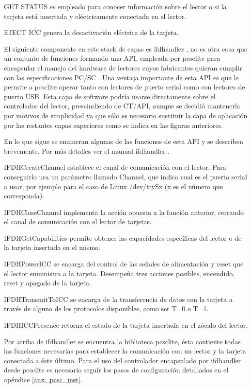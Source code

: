 GET STATUS es empleado para conocer información sobre el lector o si la tarjeta está insertada y eléctricamente conectada en el lector. 

EJECT ICC genera la desactivación eléctrica de la tarjeta.

\bigskip
{}
El siguiente componente en este stack de capas es ifdhandler \cite{ifdhandler}, no es otra cosa que un conjunto de funciones formando una API, empleada por pcsclite para encapsular el manejo del hardware de  lectores cuyos fabricantes quieran cumplir con las especificaciones PC/SC \cite{pcsclite_esp}. Una ventaja importante de esta API es que le permite a pcsclite operar tanto con lectores de puerto serial como con lectores de puerto USB.
Esta capa de software podría usarse directamente sobre el controlador del lector, prescindiendo de CT/API, aunque se decidió mantenerla por motivos de simplicidad ya que sólo es necesario sustituir la capa de aplicación por las restantes capas superiores como se indica en las figuras anteriores.

\bigskip
En lo que sigue se enumeran algunas de las funciones de esta API y se describen brevemente. Por más detalles ver el manual ifdhandler \cite{ifdhandler}.

\bigskip
IFDHCreateChannel establece el canal de comunicación con el lector. Para conseguirlo usa un parámetro llamado Channel, que indica cual es el puerto serial a usar, por ejemplo para el caso de Linux /dev/ttySx (x es el número que corresponda).

IFDHCloseChannel implementa la acción opuesta a la función anterior, cerrando el canal de comunicación con el lector de tarjetas.

IFDHGetCapabilities permite obtener las capacidades específicas del lector o de la tarjeta insertada en el mismo.

IFDHPowerICC se encarga del control de las señales de alimentación y reset que el lector suministra a la tarjeta. Desempeña tres acciones posibles, encendido, reset y apagado de la tarjeta.

IFDHTransmitToICC se encarga de la transferencia de datos con la tarjeta a través de alguno de los protocolos disponibles, como ser T=0 o T=1.

IFDHICCPresence retorna el estado de la tarjeta insertada en el zócalo del lector.

\bigskip
{}
Por arriba de ifdhandler se encuentra la biblioteca pcsclite, ésta contiente todas las funciones necesarias para establecer la comunicación con un lector y la tarjeta conectada a éste último. Para el uso del controlador encapsulado por ifdhandler desde pcsclite es necesario seguir los pasos de configuración detallados en el apéndice \ref{anx_pcsc_inst}.


